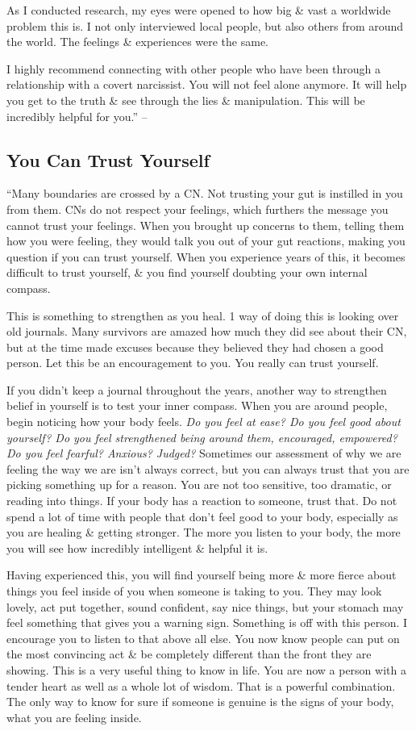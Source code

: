 \documentclass{article}
\numberwithin{equation}{section}
\begin{document}
As I conducted research, my eyes were opened to how big \& vast a worldwide problem this is. I not only interviewed local people, but also others from around the world. The feelings \& experiences were the same.

I highly recommend connecting with other people who have been through a relationship with a covert narcissist. You will not feel alone anymore. It will help you get to the truth \& see through the lies \& manipulation. This will be incredibly helpful for you.'' -- \cite[pp. 165--166]{Mirza2017}

\subsection{You Can Trust Yourself}
``Many boundaries are crossed by a CN. Not trusting your gut is instilled in you from them. CNs do not respect your feelings, which furthers the message you cannot trust your feelings. When you brought up concerns to them, telling them how you were feeling, they would talk you out of your gut reactions, making you question if you can trust yourself. When you experience years of this, it becomes difficult to trust yourself, \& you find yourself doubting your own internal compass.

This is something to strengthen as you heal. 1 way of doing this is looking over old journals. Many survivors are amazed how much they did see about their CN, but at the time made excuses because they believed they had chosen a good person. Let this be an encouragement to you. You really can trust yourself.

If you didn't keep a journal throughout the years, another way to strengthen belief in yourself is to test your inner compass. When you are around people, begin noticing how your body feels. \textit{Do you feel at ease? Do you feel good about yourself? Do you feel strengthened being around them, encouraged, empowered? Do you feel fearful? Anxious? Judged?} Sometimes our assessment of why we are feeling the way we are isn't always correct, but you can always trust that you are picking something up for a reason. You are not too sensitive, too dramatic, or reading into things. If your body has a reaction to someone, trust that. Do not spend a lot of time with people that don't feel good to your body, especially as you are healing \& getting stronger. The more you listen to your body, the more you will see how incredibly intelligent \& helpful it is.

Having experienced this, you will find yourself being more \& more fierce about things you feel inside of you when someone is taking to you. They may look lovely, act put together, sound confident, say nice things, but your stomach may feel something that gives you a warning sign. Something is off with this person. I encourage you to listen to that above all else. You now know people can put on the most convincing act \& be completely different than the front they are showing. This is a very useful thing to know in life. You are now a person with a tender heart as well as a whole lot of wisdom. That is a powerful combination. The only way to know for sure if someone is genuine is the signs of your body, what you are feeling inside.
\end{document}
